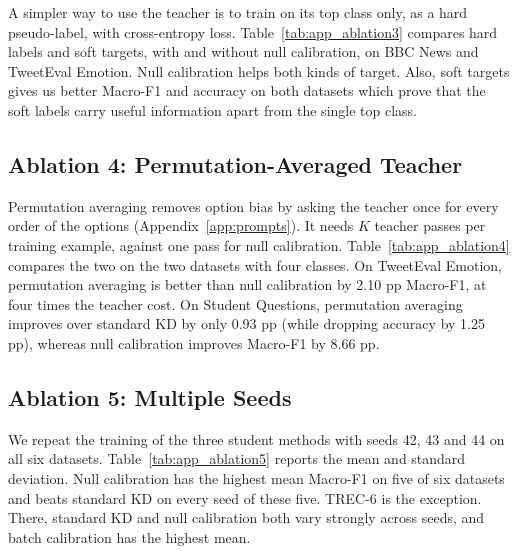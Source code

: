 \documentclass[11pt]{article}
\begin{document}
A simpler way to use the teacher is to train on its top class only, as a hard pseudo-label, with cross-entropy loss.
Table~\ref{tab:app_ablation3} compares hard labels and soft targets, with and without null calibration, on BBC News and TweetEval Emotion.
Null calibration helps both kinds of target.
Also, soft targets gives us better Macro-F1 and accuracy on both datasets which prove that the soft labels carry useful information apart from the single top class.



\subsection{Ablation 4: Permutation-Averaged Teacher}
\label{app:abl_permutation}

Permutation averaging removes option bias by asking the teacher once for every order of the options (Appendix~\ref{app:prompts}).
It needs $K$ teacher passes per training example, against one pass for null calibration.
Table~\ref{tab:app_ablation4} compares the two on the two datasets with four classes.
On TweetEval Emotion, permutation averaging is better than null calibration by 2.10 pp Macro-F1, at four times the teacher cost.
On Student Questions, permutation averaging improves over standard KD by only 0.93 pp (while dropping accuracy by 1.25 pp), whereas null calibration improves Macro-F1 by 8.66 pp.



\subsection{Ablation 5: Multiple Seeds}
\label{app:abl_seeds}

We repeat the training of the three student methods with seeds 42, 43 and 44 on all six datasets.
Table~\ref{tab:app_ablation5} reports the mean and standard deviation.
Null calibration has the highest mean Macro-F1 on five of six datasets and beats standard KD on every seed of these five.
TREC-6 is the exception.
There, standard KD and null calibration both vary strongly across seeds, and batch calibration has the highest mean.


\end{document}
